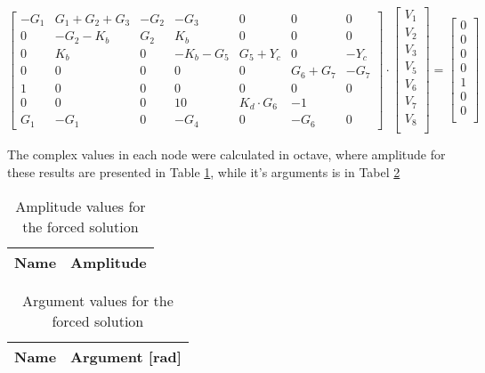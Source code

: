 \begin{equation}
    \begin{bmatrix}
        -G_1 & G_1+G_2+G_3 & -G_2 & -G_3 & 0 & 0 & 0\\
        0 & -G_2-K_b & G_2 & K_b & 0 & 0 & 0\\ 
        0 & K_b & 0 & -K_b-G_5 & G_5+Y_c & 0 & -Y_c\\
        0 & 0 & 0 & 0 & 0 & G_6+G_7 & -G_7\\
        1 & 0 & 0 & 0 & 0 & 0 & 0\\
        0 & 0 & 0 & 1 0 & K_d \cdot G_6 & -1\\
        G_1 & -G_1 & 0 & -G_4 & 0 & -G_6 & 0
    \end{bmatrix}
    \cdot
    \begin{bmatrix}
    V_1\\
    V_2\\
    V_3\\
    V_5\\
    V_6\\
    V_7\\
    V_8\\
    \end{bmatrix}
    =
    \begin{bmatrix}
    0\\0\\0\\0\\1\\0\\0\\
    \end{bmatrix}
    \label{eq:forced_matrix}
\end{equation}

The complex values in each node were calculated in octave, where amplitude for these results are presented in Table \ref{tab4_Amp}, while it's arguments is in Tabel \ref{tab4_Arg}


\begin{table}[!ht]
  \centering
  \begin{tabular}{|l|r|}
    \hline    
    {\bf Name} & {\bf Amplitude} \\ \hline
    
  \end{tabular}
  \caption{Amplitude values for the forced solution}
  \label{tab4_Amp}
\end{table}


\begin{table}[!ht]
  \centering
  \begin{tabular}{|l|r|}
    \hline    
    {\bf Name} & {\bf Argument [rad]} \\ \hline
    
  \end{tabular}
  \caption{Argument values for the forced solution }
  \label{tab4_Arg}
\end{table}

